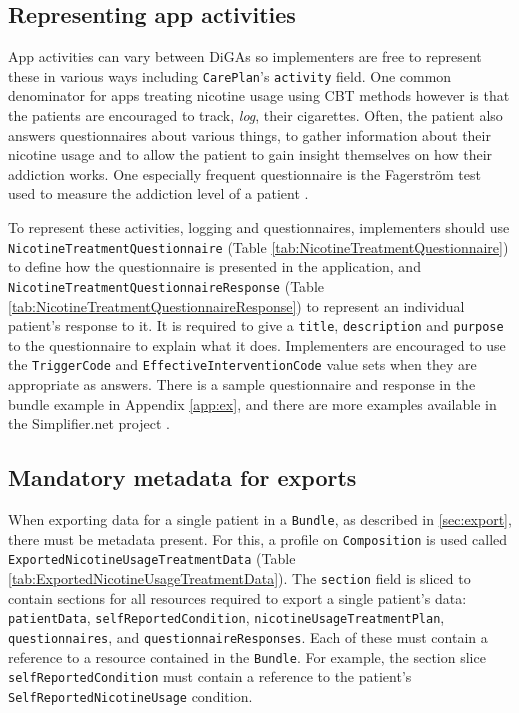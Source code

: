 \documentclass[12px]{report}
\def\code#1{\texttt{#1}} %
\newcommand{\tabquestionnaire}{}
\newcommand{\tabresponse}{}
\newcommand{\tabcomposition}{}
\begin{document}
\subsection{Representing app activities}
\tabquestionnaire
\tabresponse
App activities can vary between DiGAs so implementers are free to represent these in various ways including \code{CarePlan}'s \code{activity} field. 
One common denominator for apps treating nicotine usage using CBT methods however is that the patients are encouraged to track, \textit{log}, their cigarettes. 
Often, the patient also answers questionnaires about various things, to gather information about their nicotine usage and to allow the patient to gain insight themselves on how their addiction works.
One especially frequent questionnaire is the Fagerström test used to measure the addiction level of a patient \cite{fagerstrom}.

To represent these activities, logging and questionnaires, implementers should use \code{NicotineTreatmentQuestionnaire} (Table \ref{tab:NicotineTreatmentQuestionnaire}) to define how the questionnaire is presented in the application, 
and \code{NicotineTreatmentQuestionnaireResponse} (Table \ref{tab:NicotineTreatmentQuestionnaireResponse}) to represent an individual patient's response to it. It is required to give a \code{title}, \code{description} and \code{purpose} to the questionnaire to explain what it does.
Implementers are encouraged to use the \code{TriggerCode} and \code{EffectiveInterventionCode} value sets when they are appropriate as answers. There is a sample questionnaire and response in the bundle example in Appendix \ref{app:ex},
and there are more examples available in the Simplifier.net project \cite{project}.

\subsection{Mandatory metadata for exports}
\label{sec:comp}
\tabcomposition
When exporting data for a single patient in a \code{Bundle}, as described in \ref{sec:export}, there must be metadata present. 
For this, a profile on \code{Composition} is used called \code{ExportedNicotineUsageTreatmentData} (Table \ref{tab:ExportedNicotineUsageTreatmentData}).
The \code{section} field is sliced to contain sections for all resources required to export a single patient's data: 
\code{patientData}, \code{selfReportedCondition}, \code{nicotineUsageTreatmentPlan}, \code{questionnaires}, and \code{questionnaireResponses}.
Each of these must contain a reference to a resource contained in the \code{Bundle}. For example, the section slice \code{selfReportedCondition} must
contain a reference to the patient's \code{SelfReportedNicotineUsage} condition.
\end{document}
